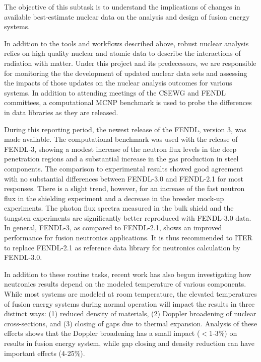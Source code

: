 The objective of this subtask is to understand the implications of changes in
available best-estimate nuclear data on the analysis and design of fusion
energy systems.

In addition to the tools and workflows described above, robust nuclear
analysis relies on high quality nuclear and atomic data to describe the
interactions of radiation with matter.  Under this project and its
predecessors, we are responsible for monitoring the the development of updated
nuclear data sets and assessing the impacts of those updates on the nuclear
analysis outcomes for various systems.  In addition to attending meetings of
the \gls{CSEWG} and \gls{FENDL} committees, a computational MCNP benchmark is
used to probe the differences in data libraries as they are released.

During this reporting period, the newest release of the \gls{FENDL}, version
3, was made available.  The computational benchmark was used with the
release of \gls{FENDL}-3, showing a modest increase of the neutron flux levels
in the deep penetration regions and a substantial increase in the gas
production in steel components.  The comparison to experimental results showed
good agreement with no substantial differences between FENDL-3.0 and FENDL-2.1
for most responses.  There is a slight trend, however, for an increase of the
fast neutron flux in the shielding experiment and a decrease in the breeder
mock-up experiments. The photon flux spectra measured in the bulk shield and
the tungsten experiments are significantly better reproduced with FENDL-3.0
data. In general, FENDL-3, as compared to FENDL-2.1, shows an improved
performance for fusion neutronics applications. It is thus recommended to ITER
to replace FENDL-2.1 as reference data library for neutronics calculation by
FENDL-3.0.\cite{fischer_benchmarking_2014, bohm_impact_2015}

In addition to these routine tasks, recent work has also begun investigating
how neutronics results depend on the modeled temperature of various
components.  While most systems are modeled at room temperature, the elevated
temperatures of fusion energy systems during normal operation will impact the
results in three distinct ways: (1) reduced density of materials, (2) Doppler
broadening of nuclear cross-sections, and (3) closing of gaps due to thermal
expansion.  Analysis of these effects shows that the Doppler broadening has a
small impact ($<$1-3\%) on results in fusion energy system, while gap closing
and density reduction can have important effects (4-25\%).

